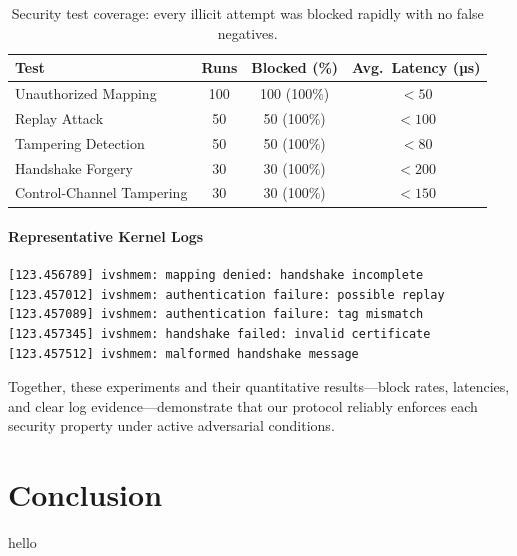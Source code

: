 \documentclass[conference]{IEEEtran}
\begin{document}
\begin{table}[!h]
  \centering
  \small
  \begin{tabular}{l c c c}
    \toprule
    \textbf{Test}             & \textbf{Runs} & \textbf{Blocked (\%)} & \textbf{Avg.\ Latency (µs)} \\
    \midrule
    Unauthorized Mapping      & 100           & 100 (100\%)           & $<50$                       \\
    Replay Attack             & 50            & 50 (100\%)            & $<100$                      \\
    Tampering Detection       & 50            & 50 (100\%)            & $<80$                       \\
    Handshake Forgery         & 30            & 30 (100\%)            & $<200$                      \\
    Control‐Channel Tampering & 30            & 30 (100\%)            & $<150$                      \\
    \bottomrule
  \end{tabular}
  \caption{Security test coverage: every illicit attempt was blocked rapidly with no false negatives.}
  \label{tab:sec_results}
\end{table}

\paragraph{Representative Kernel Logs}
\begin{verbatim}
[123.456789] ivshmem: mapping denied: handshake incomplete
[123.457012] ivshmem: authentication failure: possible replay
[123.457089] ivshmem: authentication failure: tag mismatch
[123.457345] ivshmem: handshake failed: invalid certificate
[123.457512] ivshmem: malformed handshake message
\end{verbatim}

Together, these experiments and their quantitative results—block rates,
latencies, and clear log evidence—demonstrate that our protocol reliably
enforces each security property under active adversarial conditions.


\section{Conclusion}

hello

\end{document}
